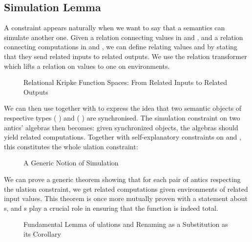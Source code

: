 \subsection{Simulation Lemma}

A  constraint appears naturally when we want to say that a
semantics can simulate another one. Given a relation connecting values
in  and , and a relation connecting computations in
 and , we can define  relating values
   and   
by stating that they send related inputs to related outputs. We use
the relation transformer  which lifts a relation on values
to one on environments.

\begin{figure}[h]
\caption{Relational Kripke Function Spaces: From Related Inputs to Related Outputs}
\end{figure}

We can then use  together with  to express the idea
that two semantic objects of respective types
   (  ) and
   (  ) are
synchronised. The simulation constraint on two antics' algebras
then becomes: given synchronized objects, the algebras should yield
related computations. Together with self-explanatory constraints on
 and , this constitutes the whole ulation
constraint:

\begin{figure}[h]
\caption{A Generic Notion of Simulation}
\end{figure}

We can prove a generic theorem showing that for each pair of antics
respecting the ulation constraint, we get related computations given
environments of related input values. This theorem is once more mutually
proven with a statement about s, and s play a crucial
role in ensuring that the function is indeed total.

\begin{figure}[h]
\caption{Fundamental Lemma of ulations and Renaming as a Substitution as its Corollary}
\end{figure}

